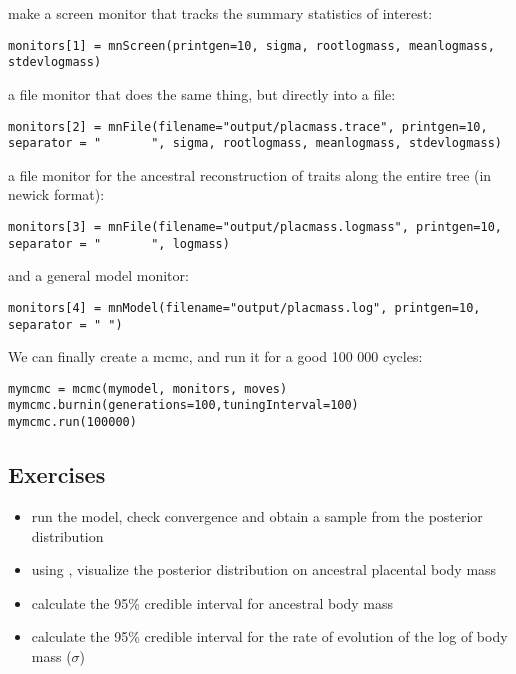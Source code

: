 make a screen monitor that tracks the summary statistics of interest:
{\tt \small \begin{snugshade*}
\begin{lstlisting}
monitors[1] = mnScreen(printgen=10, sigma, rootlogmass, meanlogmass, stdevlogmass)
\end{lstlisting}
\end{snugshade*}}

a file monitor that does the same thing, but directly into a file:
{\tt \small \begin{snugshade*}
\begin{lstlisting}
monitors[2] = mnFile(filename="output/placmass.trace", printgen=10, separator = "       ", sigma, rootlogmass, meanlogmass, stdevlogmass)
\end{lstlisting}
\end{snugshade*}}

a file monitor for the ancestral reconstruction of traits along the entire tree (in newick format):
{\tt \small \begin{snugshade*}
\begin{lstlisting}
monitors[3] = mnFile(filename="output/placmass.logmass", printgen=10, separator = "       ", logmass)
\end{lstlisting}
\end{snugshade*}}

and a general model monitor:
{\tt \small \begin{snugshade*}
\begin{lstlisting}
monitors[4] = mnModel(filename="output/placmass.log", printgen=10, separator = " ")
\end{lstlisting}
\end{snugshade*}}

We can finally create a mcmc, and run it for a good 100 000 cycles:
{\tt \small \begin{snugshade*}
\begin{lstlisting}
mymcmc = mcmc(mymodel, monitors, moves)
mymcmc.burnin(generations=100,tuningInterval=100)
mymcmc.run(100000)
\end{lstlisting}
\end{snugshade*}}

\subsection*{Exercises}

\begin{itemize}
\item
run the model, check convergence and obtain a sample from the posterior distribution
\item
using , visualize the posterior distribution on ancestral placental body mass
\item
calculate the 95\% credible interval for ancestral body mass
\item
calculate the 95\% credible interval for the rate of evolution of the log of body mass ($\sigma$)
\end{itemize}



